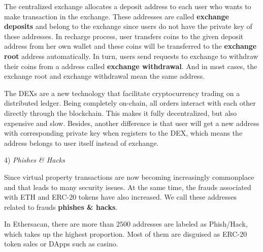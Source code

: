 The centralized exchange allocates a deposit address to each user who wants to make transaction in the exchange. These addresses are called \textbf{exchange deposits} and belong to the exchange since users do not have the private key of these addresses. In recharge process, user transfers coins to the given deposit address from her own wallet and these coins will be transferred to the \textbf{exchange root} address automatically. In turn, users send requests to exchange to withdraw their coins from a address called \textbf{exchange withdrawal}. And in most cases, the exchange root and exchange withdrawal mean the same address.


The DEXs are a new technology that facilitate cryptocurrency trading on a distributed ledger. Being completely on-chain, all orders interact with each other directly through the blockchain. This makes it fully decentralized, but also expensive and slow. Besides, another difference is that user will get a new address with corresponding private key when registers to the DEX, which means the address belongs to user itself instead of exchange. 
 


4) \emph{Phishes \& Hacks}

Since virtual property transactions are now becoming increasingly commonplace and that leads to many security issues. At the same time, the frauds associated with ETH and ERC-20 tokens have also increased. We call these addresses related to frauds \textbf{phishes \& hacks}.

 In Ethersacan, there are more than $2500$ addresses are labeled as Phish/Hack, which takes up the highest proportion. Most of them are disguised as ERC-20 token sales or DApps such as casino. 

